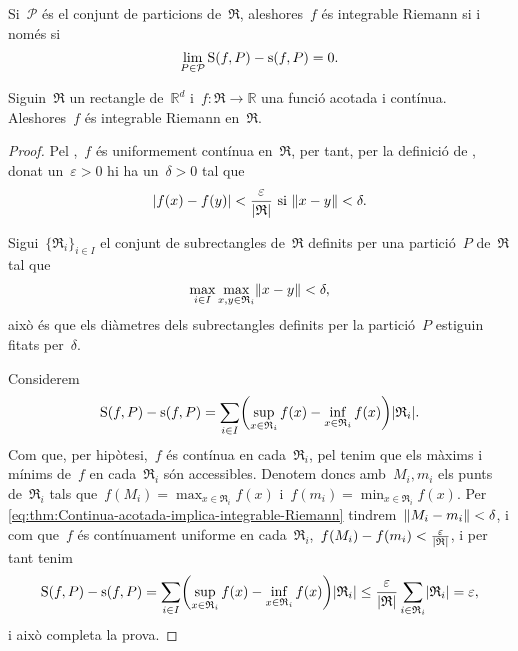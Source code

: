 \documentclass[../../main.tex]{subfiles}
\begin{document}
    \begin{corollary}\label{corollary:Sumes-superior-i-inferior-iguals-integrable-Riemann}
        Si~\(\mathcal{P}\) és el conjunt de particions de~\(\mathfrak{R}\), aleshores~\(f\) és integrable Riemann si i només si
        \[
            \lim_{P\in\mathcal{P}}\operatorname{S}(f,P)-\operatorname{s}(f,P)=0.
        \]%
    \end{corollary}
    \begin{theorem}
        \label{thm:Continua-acotada-implica-integrable-Riemann}
        Siguin~\(\mathfrak{R}\) un rectangle de~\(\mathbb{R}^{d}\) i~\(f\colon\mathfrak{R}\to\mathbb{R}\) una funció acotada i contínua.
        Aleshores~\(f\) és integrable Riemann en~\(\mathfrak{R}\).
    \end{theorem}
    \begin{proof}
        Pel ,~\(f\) és uniformement contínua en~\(\mathfrak{R}\), per tant, per la definició de , donat un~\(\varepsilon>0\) hi ha un~\(\delta>0\) tal que
        \[
            \abs{f(x)-f(y)}<\frac{\varepsilon}{\abs{\mathfrak{R}}}\text{ si }\norm{x-y}<\delta.
        \]

        Sigui~\(\{\mathfrak{R}_{i}\}_{i\in I}\) el conjunt de subrectangles de~\(\mathfrak{R}\) definits per una partició~\(P\) de~\(\mathfrak{R}\) tal que
        \[
            \max_{i\in I}\max_{x,y\in \mathfrak{R}_{i}}\norm{x-y}<\delta,
        \]
        això és que els diàmetres dels subrectangles definits per la partició~\(P\) estiguin fitats per~\(\delta\).

        Considerem
        \begin{equation}\label{eq:thm:Continua-acotada-implica-integrable-Riemann}
        \Ssup(f,P)-\sinf(f,P)=\sum_{i\in I}\left(\sup_{x\in \mathfrak{R}_{i}}f(x)-\inf_{x\in \mathfrak{R}_{i}}f(x)\right)\abs{\mathfrak{R}_{i}}.
        \end{equation}
        Com que, per hipòtesi,~\(f\) és contínua en cada~\(\mathfrak{R}_{i}\), pel  tenim que els màxims i mínims de~\(f\) en cada~\(\mathfrak{R}_{i}\) són accessibles.
        Denotem doncs amb~\(M_{i},m_{i}\) els punts de~\(\mathfrak{R}_{i}\) tals que~\(f(M_{i})=\max_{x\in \mathfrak{R}_{i}}f(x)\) i~\(f(m_{i})=\min_{x\in \mathfrak{R}_{i}}f(x)\).
        Per \eqref{eq:thm:Continua-acotada-implica-integrable-Riemann} tindrem~\(\norm{M_{i}-m_{i}}<\delta\), i com que~\(f\) és contínuament uniforme en cada~\(\mathfrak{R}_{i}\),~\(f(M_{i})-f(m_{i})<\frac{\varepsilon}{\abs{\mathfrak{R}}}\), i per tant tenim
        \[
            \Ssup(f,P)-\sinf(f,P)=\sum_{i\in I}\left(\sup_{x\in \mathfrak{R}_{i}}f(x)-\inf_{x\in \mathfrak{R}_{i}}f(x)\right)\abs{\mathfrak{R}_{i}}\leq\frac{\varepsilon}{\abs{\mathfrak{R}}}\sum_{i\in \mathfrak{R}_{i}}\abs{\mathfrak{R}_{i}}=\varepsilon,
        \]
        i això completa la prova.
    \end{proof}
\end{document}
